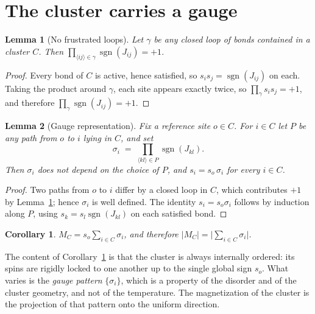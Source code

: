 \documentclass[11pt]{article}
\newtheorem{lemma}{Lemma}
\newtheorem{corollary}{Corollary}
\theoremstyle{remark}
\newcommand{\Mc}{M_{C}}
\begin{document}
\section{The cluster carries a gauge}

\begin{lemma}[No frustrated loops]\label{lem:loops}
Let $\gamma$ be any closed loop of bonds contained in a cluster $C$. Then
$\prod_{\langle ij\rangle \in \gamma} \operatorname{sgn}(J_{ij}) = +1$.
\end{lemma}

\begin{proof}
Every bond of $C$ is active, hence satisfied, so $s_i s_j = \operatorname{sgn}(J_{ij})$ on
each. Taking the product around $\gamma$, each site appears exactly twice, so
$\prod_{\gamma} s_i s_j = +1$, and therefore
$\prod_{\gamma}\operatorname{sgn}(J_{ij}) = +1$.
\end{proof}

\begin{lemma}[Gauge representation]\label{lem:gauge}
Fix a reference site $o \in C$. For $i \in C$ let $P$ be any path from $o$ to $i$ lying in
$C$, and set
\begin{equation}
  \sigma_i \;=\; \prod_{\langle kl\rangle \in P} \operatorname{sgn}(J_{kl}).
\end{equation}
Then $\sigma_i$ does not depend on the choice of $P$, and $s_i = s_o\,\sigma_i$ for every
$i \in C$.
\end{lemma}

\begin{proof}
Two paths from $o$ to $i$ differ by a closed loop in $C$, which contributes $+1$ by
Lemma~\ref{lem:loops}; hence $\sigma_i$ is well defined. The identity
$s_i = s_o \sigma_i$ follows by induction along $P$, using
$s_k = s_l \operatorname{sgn}(J_{kl})$ on each satisfied bond.
\end{proof}

\begin{corollary}\label{cor:Mc}
$\Mc = s_o \sum_{i\in C}\sigma_i$, and therefore
$|\Mc| = \bigl|\sum_{i \in C}\sigma_i\bigr|$.
\end{corollary}

The content of Corollary~\ref{cor:Mc} is that the cluster is always internally ordered:
its spins are rigidly locked to one another up to the single global sign $s_o$. What
varies is the \emph{gauge pattern} $\{\sigma_i\}$, which is a property of the disorder and
of the cluster geometry, and not of the temperature. The magnetization of the cluster is
the projection of that pattern onto the uniform direction.
\end{document}
